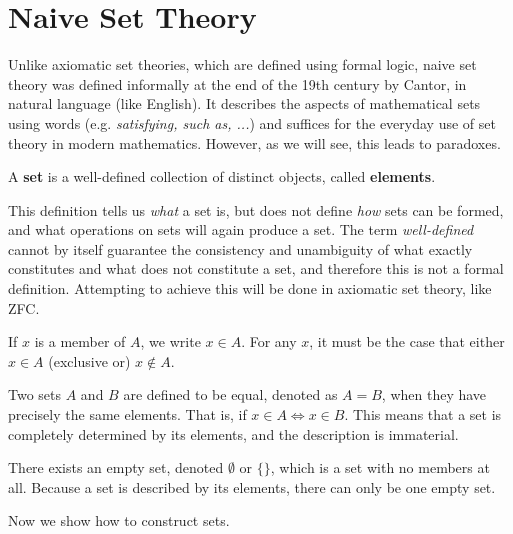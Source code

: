 \section{Naive Set Theory}

Unlike axiomatic set theories, which are defined using formal logic, naive set theory was defined informally at the end of the 19th century by Cantor, in natural language (like English). It describes the aspects of mathematical sets using words (e.g. \textit{satisfying, such as, ...}) and suffices for the everyday use of set theory in modern mathematics. However, as we will see, this leads to paradoxes. 

\begin{definition}[Set]
  A \textbf{set} is a well-defined collection of distinct objects, called \textbf{elements}. 
\end{definition}

This definition tells us \textit{what} a set is, but does not define \textit{how} sets can be formed, and what operations on sets will again produce a set. The term \textit{well-defined} cannot by itself guarantee the consistency and unambiguity of what exactly constitutes and what does not constitute a set, and therefore this is not a formal definition. Attempting to achieve this will be done in axiomatic set theory, like ZFC. 

\begin{definition}[Membership]
  If $x$ is a member of $A$, we write $x \in A$. For any $x$, it must be the case that either $x \in A$ (exclusive or) $x \not\in A$. 
\end{definition}

\begin{definition}[Equality]
  Two sets $A$ and $B$ are defined to be equal, denoted as $A = B$, when they have precisely the same elements. That is, if $x \in A \iff x \in B$. This means that a set is completely determined by its elements, and the description is immaterial. 
\end{definition}

\begin{definition}
  There exists an empty set, denoted $\emptyset$ or $\{\}$, which is a set with no members at all. Because a set is described by its elements, there can only be one empty set. 
\end{definition}

Now we show how to construct sets. 

